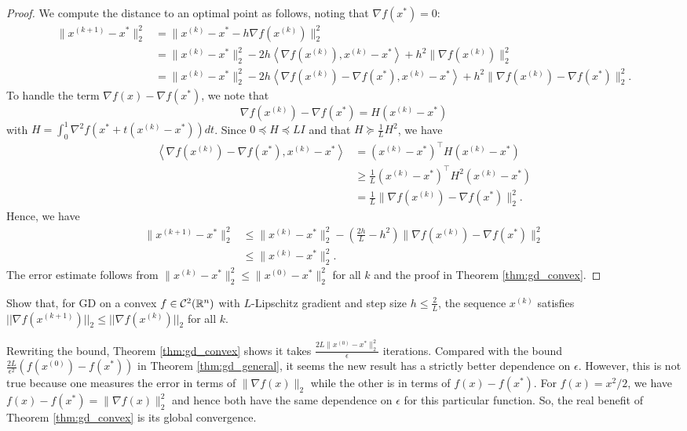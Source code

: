 \begin{proof}
We compute the distance to an optimal point as follows, noting that
$\nabla f(x^{*})=0$:
\begin{align*}
\|x^{(k+1)}-x^{*}\|^{2}_{2} & =\|x^{(k)}-x^{*}-h\nabla f(x^{(k)})\|^{2}_{2}\\
 & =\|x^{(k)}-x^{*}\|^{2}_{2}-2h\left\langle \nabla f(x^{(k)}),x^{(k)}-x^{*}\right\rangle +h^{2}\|\nabla f(x^{(k)})\|^{2}_{2}\\
 & =\|x^{(k)}-x^{*}\|^{2}_{2}-2h\left\langle \nabla f(x^{(k)})-\nabla f(x^{*}),x^{(k)}-x^{*}\right\rangle +h^{2}\|\nabla f(x^{(k)})-\nabla f(x^{*})\|^{2}_{2}.
\end{align*}
To handle the term $\nabla f(x)-\nabla f(x^{*})$, we note that
\[
\nabla f(x^{(k)})-\nabla f(x^{*})=H(x^{(k)}-x^{*})
\]
with $H=\int^{1}_{0}\nabla^{2}f(x^{*}+t(x^{(k)}-x^{*}))dt$. Since
$0\preceq H\preceq LI$ and that $H\succeq\frac{1}{L}H^{2}$, we have
\begin{align*}
\left\langle \nabla f(x^{(k)})-\nabla f(x^{*}),x^{(k)}-x^{*}\right\rangle  & =(x^{(k)}-x^{*})^{\top}H(x^{(k)}-x^{*})\\
 & \geq\frac{1}{L}(x^{(k)}-x^{*})^{\top}H^{2}(x^{(k)}-x^{*})\\
 & =\frac{1}{L}\|\nabla f(x^{(k)})-\nabla f(x^{*})\|^{2}_{2}.
\end{align*}
Hence, we have
\begin{align*}
\|x^{(k+1)}-x^{*}\|^{2}_{2} & \leq\|x^{(k)}-x^{*}\|^{2}_{2}-(\frac{2h}{L}-h^{2})\|\nabla f(x^{(k)})-\nabla f(x^{*})\|^{2}_{2}\\
 & \leq\|x^{(k)}-x^{*}\|^{2}_{2}.
\end{align*}
The error estimate follows from $\|x^{(k)}-x^{*}\|^{2}_{2}\leq\|x^{(0)}-x^{*}\|^{2}_{2}$
for all $k$ and the proof in Theorem \ref{thm:gd_convex}.
\end{proof}
\begin{xca}
Show that, for GD on a convex $f\in\mathcal{C}^{2}(\mathbb{R}^{n})$ with
$L$-Lipschitz gradient and step size $h\leq\frac{2}{L}$, the sequence
$x^{(k)}$ satisfies $||\nabla f(x^{(k+1)})||_{2}\leq||\nabla f(x^{(k)})||_{2}$
for all $k$. 
\end{xca}

Rewriting the bound, Theorem \ref{thm:gd_convex} shows it takes $\frac{2L\|x^{(0)}-x^{*}\|^{2}_{2}}{\epsilon}$
iterations. Compared with the bound $\frac{2L}{\epsilon^{2}}\left(f(x^{(0)})-f(x^{*})\right)$
in Theorem \ref{thm:gd_general}, it seems the new result has a strictly
better dependence on $\epsilon$. However, this is not true because
one measures the error in terms of $\|\nabla f(x)\|_{2}$ while the
other is in terms of $f(x)-f(x^{*})$. For $f(x)=x^{2}/2$, we have
$f(x)-f(x^{*})=\|\nabla f(x)\|^{2}_{2}$ and hence both have the same
dependence on $\epsilon$ for this particular function. So, the real
benefit of Theorem \ref{thm:gd_convex} is its global convergence.

